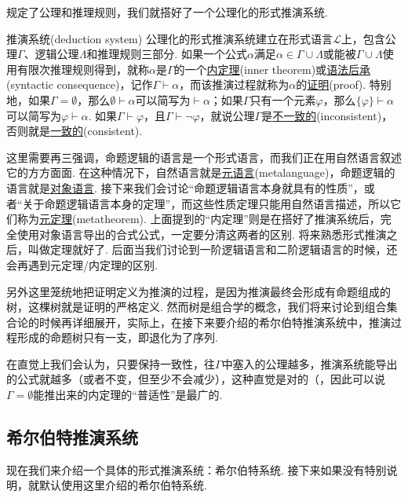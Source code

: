 \documentclass[main.tex]{subfiles}
\begin{document}
规定了公理和推理规则，我们就搭好了一个公理化的形式推演系统.

\begin{definition}{推演系统(deduction system)}
    公理化的形式推演系统建立在形式语言\(\mathcal{L}\)上，包含公理\(\Gamma\)、逻辑公理\(\Lambda\)和推理规则三部分. 如果一个公式\(\alpha\)满足\(\alpha \in \Gamma \cup \Lambda\)或能被\(\Gamma \cup \Lambda\)使用有限次推理规则得到，就称\(\alpha\)是\(\Gamma\)的一个\uline{内定理}(inner theorem)或\uline{语法后承}(syntactic consequence)，记作\(\Gamma \vdash \alpha\)，而该推演过程就称为\(\alpha\)的\uline{证明}(proof). \newline
    特别地，如果\(\Gamma=\emptyset\)，那么\(\emptyset \vdash \alpha\)可以简写为\(\vdash \alpha\)；如果\(\Gamma\)只有一个元素\(\varphi\)，那么\(\{\varphi\} \vdash \alpha\)可以简写为\(\varphi \vdash \alpha\). \newline
    如果\(\Gamma \vdash \varphi\)，且\(\Gamma \vdash \neg \varphi\)，就说公理\(\Gamma\)是\uline{不一致的}(inconsistent)，否则就是\uline{一致的}(consistent). 
\end{definition}

这里需要再三强调，命题逻辑的语言是一个形式语言，而我们正在用自然语言叙述它的方方面面. 在这种情况下，自然语言就是\uline{元语言}(metalanguage)，命题逻辑的语言就是\uline{对象语言}. 接下来我们会讨论“命题逻辑语言本身就具有的性质”，或者“关于命题逻辑语言本身的定理”，而这些性质定理只能用自然语言描述，所以它们称为\uline{元定理}(metatheorem). 上面提到的“内定理”则是在搭好了推演系统后，完全使用对象语言导出的合式公式，一定要分清这两者的区别. 将来熟悉形式推演之后，叫做定理就好了. 后面当我们讨论到一阶逻辑语言和二阶逻辑语言的时候，还会再遇到元定理/内定理的区别.

另外这里笼统地把证明定义为推演的过程，是因为推演最终会形成有命题组成的树，这棵树就是证明的严格定义. 然而树是组合学的概念，我们将来讨论到组合集合论的时候再详细展开，实际上，在接下来要介绍的希尔伯特推演系统中，推演过程形成的命题树只有一支，即退化为了序列. 

在直觉上我们会认为，只要保持一致性，往\(\Gamma\)中塞入的公理越多，推演系统能导出的公式就越多（或者不变，但至少不会减少），这种直觉是对的（，因此可以说\(\Gamma=\emptyset\)能推出来的内定理的“普适性”是最广的.

\subsection{希尔伯特推演系统}

现在我们来介绍一个具体的形式推演系统：希尔伯特系统. 接下来如果没有特别说明，就默认使用这里介绍的希尔伯特系统. 
\end{document}
